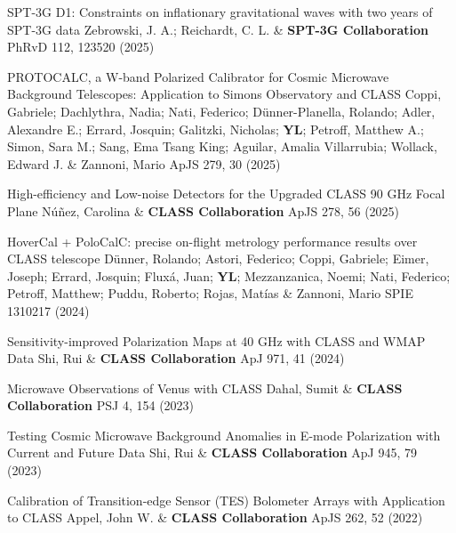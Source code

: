 \begin{etaremune}[topsep=0pt,itemsep=0pt,partopsep=0pt,parsep=0pt]
            {SPT-3G D1: Constraints on inflationary gravitational waves with two years of SPT-3G data}
            {Zebrowski, J. A.; Reichardt, C. L. \& \textbf{SPT-3G Collaboration}}
            {PhRvD 112, 123520 (2025)}

            {PROTOCALC, a W-band Polarized Calibrator for Cosmic Microwave Background Telescopes: Application to Simons Observatory and CLASS}
            {Coppi, Gabriele; Dachlythra, Nadia; Nati, Federico; Dünner-Planella, Rolando; Adler, Alexandre E.; Errard, Josquin; Galitzki, Nicholas; \textbf{YL}; Petroff, Matthew A.; Simon, Sara M.; Sang, Ema Tsang King; Aguilar, Amalia Villarrubia; Wollack, Edward J. \& Zannoni, Mario}
            {ApJS 279, 30 (2025)}

            {High-efficiency and Low-noise Detectors for the Upgraded CLASS 90 GHz Focal Plane}
            {Núñez, Carolina \& \textbf{CLASS Collaboration}}
            {ApJS 278, 56 (2025)}

            {HoverCal + PoloCalC: precise on-flight metrology performance results over CLASS telescope}
            {Dünner, Rolando; Astori, Federico; Coppi, Gabriele; Eimer, Joseph; Errard, Josquin; Fluxá, Juan; \textbf{YL}; Mezzanzanica, Noemi; Nati, Federico; Petroff, Matthew; Puddu, Roberto; Rojas, Matías \& Zannoni, Mario}
            {SPIE 1310217 (2024)}

            {Sensitivity-improved Polarization Maps at 40 GHz with CLASS and WMAP Data}
            {Shi, Rui \& \textbf{CLASS Collaboration}}
            {ApJ 971, 41 (2024)}

            {Microwave Observations of Venus with CLASS}
            {Dahal, Sumit \& \textbf{CLASS Collaboration}}
            {PSJ 4, 154 (2023)}

            {Testing Cosmic Microwave Background Anomalies in E-mode Polarization with Current and Future Data}
            {Shi, Rui \& \textbf{CLASS Collaboration}}
            {ApJ 945, 79 (2023)}

            {Calibration of Transition-edge Sensor (TES) Bolometer Arrays with Application to CLASS}
            {Appel, John W. \& \textbf{CLASS Collaboration}}
            {ApJS 262, 52 (2022)}


\end{etaremune}
